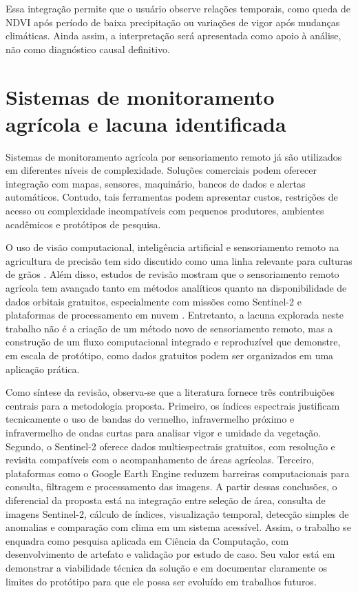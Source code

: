 Essa integração permite que o usuário observe relações temporais, como queda de NDVI após período de baixa precipitação ou variações de vigor após mudanças climáticas. Ainda assim, a interpretação será apresentada como apoio à análise, não como diagnóstico causal definitivo.

\section{Sistemas de monitoramento agrícola e lacuna identificada}

Sistemas de monitoramento agrícola por sensoriamento remoto já são utilizados em diferentes níveis de complexidade. Soluções comerciais podem oferecer integração com mapas, sensores, maquinário, bancos de dados e alertas automáticos. Contudo, tais ferramentas podem apresentar custos, restrições de acesso ou complexidade incompatíveis com pequenos produtores, ambientes acadêmicos e protótipos de pesquisa.

O uso de visão computacional, inteligência artificial e sensoriamento remoto na agricultura de precisão tem sido discutido como uma linha relevante para culturas de grãos \citep{PATRICIO2018}. Além disso, estudos de revisão mostram que o sensoriamento remoto agrícola tem avançado tanto em métodos analíticos quanto na disponibilidade de dados orbitais gratuitos, especialmente com missões como Sentinel-2 e plataformas de processamento em nuvem \citep{WEISS2020,PHIRI2020,AMANI2020}. Entretanto, a lacuna explorada neste trabalho não é a criação de um método novo de sensoriamento remoto, mas a construção de um fluxo computacional integrado e reproduzível que demonstre, em escala de protótipo, como dados gratuitos podem ser organizados em uma aplicação prática.

Como síntese da revisão, observa-se que a literatura fornece três contribuições centrais para a metodologia proposta. Primeiro, os índices espectrais justificam tecnicamente o uso de bandas do vermelho, infravermelho próximo e infravermelho de ondas curtas para analisar vigor e umidade da vegetação. Segundo, o Sentinel-2 oferece dados multiespectrais gratuitos, com resolução e revisita compatíveis com o acompanhamento de áreas agrícolas. Terceiro, plataformas como o Google Earth Engine reduzem barreiras computacionais para consulta, filtragem e processamento das imagens. A partir dessas conclusões, o diferencial da proposta está na integração entre seleção de área, consulta de imagens Sentinel-2, cálculo de índices, visualização temporal, detecção simples de anomalias e comparação com clima em um sistema acessível. Assim, o trabalho se enquadra como pesquisa aplicada em Ciência da Computação, com desenvolvimento de artefato e validação por estudo de caso. Seu valor está em demonstrar a viabilidade técnica da solução e em documentar claramente os limites do protótipo para que ele possa ser evoluído em trabalhos futuros.
